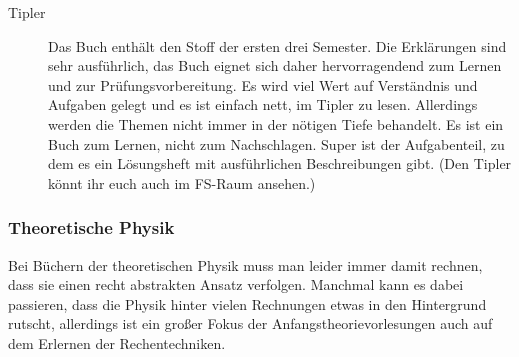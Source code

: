 \begin{description}
\item[Tipler]{
Das Buch enthält den Stoff der ersten drei Semester. Die Erklärungen
sind
sehr ausführlich, das Buch eignet sich daher hervorragendend zum
Lernen und
zur Prüfungsvorbereitung. Es wird viel Wert auf Verständnis und
Aufgaben
gelegt und es ist einfach nett, im Tipler zu lesen. Allerdings werden
die
Themen nicht immer in der nötigen Tiefe behandelt. Es ist ein
Buch zum Lernen, nicht zum Nachschlagen. Super ist der Aufgabenteil,
zu dem es
ein Lösungsheft mit ausführlichen Beschreibungen gibt. (Den Tipler
könnt ihr euch auch
im FS-Raum ansehen.)}

\end{description}

\subsubsection*{Theoretische Physik}

Bei Büchern der theoretischen Physik muss man leider immer damit rechnen,
dass sie einen recht abstrakten Ansatz verfolgen. Manchmal kann es dabei 
passieren, dass die Physik hinter vielen Rechnungen etwas in den Hintergrund 
rutscht, allerdings ist ein großer Fokus der Anfangstheorievorlesungen 
auch auf dem Erlernen der Rechentechniken.


